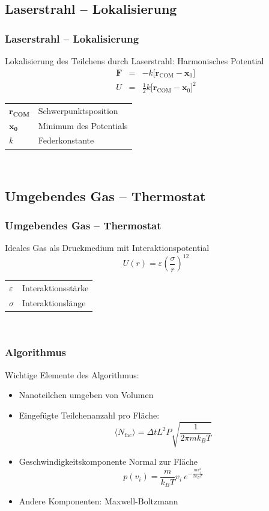 \documentclass[handout]{beamer}
\begin{document}
\subsection{Laserstrahl -- Lokalisierung}
\begin{frame} 
\frametitle{Laserstrahl -- Lokalisierung}
Lokalisierung des Teilchens durch Laserstrahl: Harmonisches Potential
\begin{eqnarray}
    \mathbf{F} &=& -k \Big[\mathbf{r}_\text{COM}-\mathbf{x}_0\Big]\\
    U &=& \frac12 k \Big[\mathbf{r}_\text{COM}-\mathbf{x}_0\Big]^2
\end{eqnarray}
\begin{tabular}{l l}
$\mathbf{r_\text{COM}}$ & Schwerpunktsposition\\
$\mathbf{x_0}$ & Minimum des Potentials\\
$k$ & Federkonstante\\
\end{tabular}\\
\end{frame}

\subsection{Umgebendes Gas -- Thermostat}
\begin{frame}
\frametitle{Umgebendes Gas -- Thermostat}
Ideales Gas als Druckmedium mit Interaktionspotential
\begin{equation}
    \label{eq:softsphere}
    U(r) = \varepsilon \left(\frac{\sigma}{r}\right)^{12}
\end{equation}
\begin{tabular}{l l}
$\varepsilon$ & Interaktionsstärke\\
$\sigma$ & Interaktionslänge\\
\end{tabular}\\
\end{frame}

\begin{frame}
\frametitle{Algorithmus}
Wichtige Elemente des Algorithmus:
\begin{itemize}
\item Nanoteilchen umgeben von Volumen
\item Eingefügte Teilchenanzahl pro Fläche: 
\begin{equation}
    \langle N_\text{fac}\rangle = \Delta t L^2 P \sqrt{\frac{1}{2\pi m k_B T}}
\end{equation}
\item Geschwindigkeitskomponente Normal zur Fläche
\begin{equation}
    p(v_i) = \frac{m}{k_B T}v_i \ e^{-\frac{mv_i^2}{2k_BT}}
\end{equation}
\item Andere Komponenten: Maxwell-Boltzmann
\end{itemize}
\end{frame}
\end{document}
